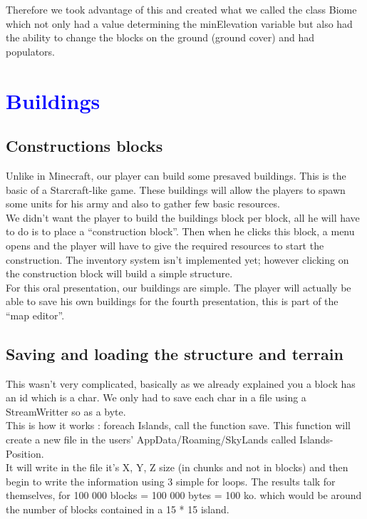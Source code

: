 \documentclass[article]{report}             %
\begin{document}
				Therefore we took advantage of this and created what we called the class Biome which not only had a value determining the minElevation variable but also had the ability to change the blocks on the ground (ground cover) and had populators.


		\chapter{\textcolor{blue}{Buildings}}
			\section{Constructions blocks}
				Unlike in Minecraft, our player can build some presaved buildings. This is the basic of a Starcraft-like game. These buildings will allow the players to spawn some units for his army and also to gather few basic resources.\\

We didn't want the player to build the buildings block per block, all he will have to do is to place a \enquote{construction block}. Then when he clicks this block, a menu opens and the player will have to give the required resources to start the construction. The inventory system isn't implemented yet; however clicking on the construction block will build a simple structure.\\

For this oral presentation, our buildings are simple. The player will actually be able to save his own buildings for the fourth presentation, this is part of the \enquote{map editor}.
			
			\section{Saving and loading the structure and terrain}
				This wasn't very complicated, basically as we already explained you a block has an id which is a char. We only had to save each char in a file using a StreamWritter so as a byte.\\
				This is how it works : foreach Islands, call the function save. This function will create a new file in the users' AppData/Roaming/SkyLands called Islands-Position.\\

				It will write in the file it's X, Y, Z size (in chunks and not in blocks) and then begin to write the information using 3 simple for loops.
				The results talk for themselves, for 100 000 blocks = 100 000 bytes = 100 ko. which would be around the number of blocks contained in a 15 * 15 island.
				
\end{document}
